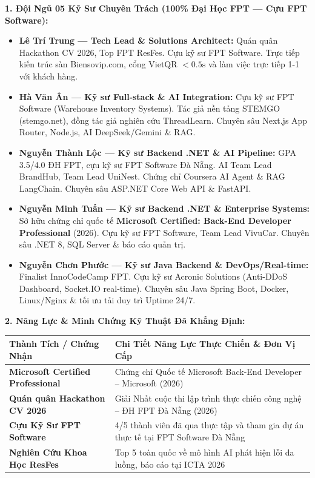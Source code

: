 \documentclass[11pt,a4paper]{article}
\begin{document}
\vspace{1.2mm}
\noindent \textbf{\color{primary}\large 1. Đội Ngũ 05 Kỹ Sư Chuyên Trách (100\% Đại Học FPT --- Cựu FPT Software):}
\begin{itemize}[leftmargin=*,itemsep=2.2pt,topsep=1pt]
    \item \textbf{Lê Trí Trung --- Tech Lead \& Solutions Architect:} Quán quân Hackathon CV 2026, Top FPT ResFes. Cựu kỹ sư FPT Software. Trực tiếp kiến trúc sàn Biensovip.com, cổng VietQR $<0.5\text{s}$ và làm việc trực tiếp 1-1 với khách hàng.
    \item \textbf{Hà Văn Ân --- Kỹ sư Full-stack \& AI Integration:} Cựu kỹ sư FPT Software (Warehouse Inventory Systems). Tác giả nền tảng STEMGO (stemgo.net), đồng tác giả nghiên cứu ThreadLearn. Chuyên sâu Next.js App Router, Node.js, AI DeepSeek/Gemini \& RAG.
    \item \textbf{Nguyễn Thành Lộc --- Kỹ sư Backend .NET \& AI Pipeline:} GPA 3.5/4.0 ĐH FPT, cựu kỹ sư FPT Software Đà Nẵng. AI Team Lead BrandHub, Team Lead UniNest. Chứng chỉ Coursera AI Agent \& RAG LangChain. Chuyên sâu ASP.NET Core Web API \& FastAPI.
    \item \textbf{Nguyễn Minh Tuấn --- Kỹ sư Backend .NET \& Enterprise Systems:} Sở hữu chứng chỉ quốc tế \textbf{Microsoft Certified: Back-End Developer Professional} (2026). Cựu kỹ sư FPT Software, Team Lead VivuCar. Chuyên sâu .NET 8, SQL Server \& báo cáo quản trị.
    \item \textbf{Nguyễn Chơn Phước --- Kỹ sư Java Backend \& DevOps/Real-time:} Finalist InnoCodeCamp FPT. Cựu kỹ sư Acronic Solutions (Anti-DDoS Dashboard, Socket.IO real-time). Chuyên sâu Java Spring Boot, Docker, Linux/Nginx \& tối ưu tải duy trì Uptime 24/7.
\end{itemize}

\vspace{1.2mm}
\noindent \textbf{\color{primary}\large 2. Năng Lực \& Minh Chứng Kỹ Thuật Đã Khẳng Định:}
\begin{center}
\small
\renewcommand{\arraystretch}{1.12}
\begin{tabularx}{\textwidth}{>{\bfseries}p{5.5cm}X}
\toprule
\textbf{Thành Tích / Chứng Nhận} & \textbf{Chi Tiết Năng Lực Thực Chiến \& Đơn Vị Cấp} \\
\midrule
Microsoft Certified Professional & Chứng chỉ Quốc tế Microsoft Back-End Developer -- Microsoft (2026) \\
Quán quân Hackathon CV 2026 & Giải Nhất cuộc thi lập trình thực chiến công nghệ -- ĐH FPT Đà Nẵng (2026) \\
Cựu Kỹ Sư FPT Software & 4/5 thành viên đã qua thực tập và tham gia dự án thực tế tại FPT Software Đà Nẵng \\
Nghiên Cứu Khoa Học ResFes & Top 5 toàn quốc về mô hình AI phát hiện lỗi đa luồng, báo cáo tại ICTA 2026 \\
\bottomrule
\end{tabularx}
\end{center}
\end{document}
